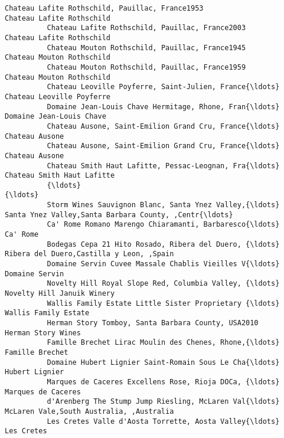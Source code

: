 \documentclass[11pt]{article}
\begin{document}
\begin{Verbatim}[commandchars=\\\{\}]
          Chateau Lafite Rothschild, Pauillac, France1953                             Chateau Lafite Rothschild   
          Chateau Lafite Rothschild, Pauillac, France2003                             Chateau Lafite Rothschild   
          Chateau Mouton Rothschild, Pauillac, France1945                             Chateau Mouton Rothschild   
          Chateau Mouton Rothschild, Pauillac, France1959                             Chateau Mouton Rothschild   
          Chateau Leoville Poyferre, Saint-Julien, France{\ldots}                          Chateau Leoville Poyferre   
          Domaine Jean-Louis Chave Hermitage, Rhone, Fran{\ldots}                           Domaine Jean-Louis Chave   
          Chateau Ausone, Saint-Emilion Grand Cru, France{\ldots}                                     Chateau Ausone   
          Chateau Ausone, Saint-Emilion Grand Cru, France{\ldots}                                     Chateau Ausone   
          Chateau Smith Haut Lafitte, Pessac-Leognan, Fra{\ldots}                         Chateau Smith Haut Lafitte   
          {\ldots}                                                                                               {\ldots}   
          Storm Wines Sauvignon Blanc, Santa Ynez Valley,{\ldots}  Santa Ynez Valley,Santa Barbara County, ,Centr{\ldots}   
          Ca' Rome Romano Marengo Chiaramanti, Barbaresco{\ldots}                                           Ca' Rome   
          Bodegas Cepa 21 Hito Rosado, Ribera del Duero, {\ldots}           Ribera del Duero,Castilla y Leon, ,Spain   
          Domaine Servin Cuvee Massale Chablis Vieilles V{\ldots}                                     Domaine Servin   
          Novelty Hill Royal Slope Red, Columbia Valley, {\ldots}                         Novelty Hill Januik Winery   
          Wallis Family Estate Little Sister Proprietary {\ldots}                               Wallis Family Estate   
          Herman Story Tomboy, Santa Barbara County, USA2010                                 Herman Story Wines   
          Famille Brechet Lirac Moulin des Chenes, Rhone,{\ldots}                                    Famille Brechet   
          Domaine Hubert Lignier Saint-Romain Sous Le Cha{\ldots}                                     Hubert Lignier   
          Marques de Caceres Excellens Rose, Rioja DOCa, {\ldots}                                 Marques de Caceres   
          d'Arenberg The Stump Jump Riesling, McLaren Val{\ldots}           McLaren Vale,South Australia, ,Australia   
          Les Cretes Valle d'Aosta Torrette, Aosta Valley{\ldots}                                         Les Cretes   

\end{Verbatim}
\end{document}
